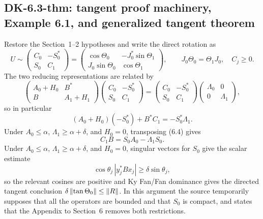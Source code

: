 \subsection*{DK-6.3-thm: tangent proof machinery, Example 6.1, and generalized tangent theorem}
Restore the Section~1--2 hypotheses and write the direct rotation as
\begin{equation}
 U\sim
 \begin{pmatrix}C_0&-S_0^*\\S_0&C_1\end{pmatrix}
 =
 \begin{pmatrix}
 \cos\Theta_0&-J_0^*\sin\Theta_1\\
 J_0\sin\Theta_0&\cos\Theta_1
 \end{pmatrix},
 \qquad J_0\Theta_0=\Theta_1J_0,
 \quad C_j\ge0.
 \tag{6.2}
\end{equation}
The two reducing representations are related by
\begin{equation}
 \begin{pmatrix}A_0+H_0&B^*\\B&A_1+H_1\end{pmatrix}
 \begin{pmatrix}C_0&-S_0^*\\S_0&C_1\end{pmatrix}
 =
 \begin{pmatrix}C_0&-S_0^*\\S_0&C_1\end{pmatrix}
 \begin{pmatrix}\Lambda_0&0\\0&\Lambda_1\end{pmatrix},
 \tag{6.3}
\end{equation}
so in particular
\begin{equation}
 (A_0+H_0)(-S_0^*)+B^*C_1=-S_0^*\Lambda_1.
 \tag{6.4}
\end{equation}
Under $A_0\le\alpha$, $\Lambda_1\ge\alpha+\delta$, and $H_0=0$, transposing (6.4) gives
\begin{equation}
 C_1B=S_0A_0-\Lambda_1S_0.
 \tag{6.5}
\end{equation}
Under $A_0\le\alpha$, $\Lambda_1\ge\alpha+\delta$, and $H_0=0$, singular vectors for $S_0$ give the scalar estimate
\begin{equation}
 \cos\theta_j\,|y_j^*Bx_j|\ge\delta\sin\theta_j,
 \tag{6.6}
\end{equation}
so the relevant cosines are positive and Ky Fan/Fan dominance gives the directed tangent conclusion $\delta\left\lVert \tan\Theta_0\right\rVert\le\left\lVert R\right\rVert$.  In this argument the source temporarily supposes that all the operators are bounded and that $S_0$ is compact, and states that the Appendix to Section~6 removes both restrictions.

